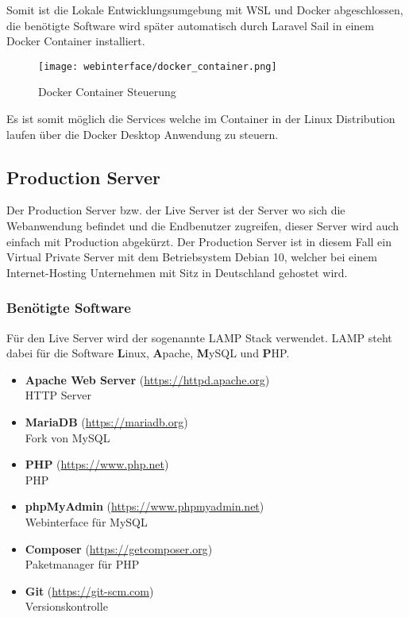 Somit ist die Lokale Entwicklungsumgebung mit WSL und Docker abgeschlossen, die
benötigte Software wird später automatisch durch Laravel Sail in einem Docker
Container installiert.

\begin{figure}[H]
  \centering
  \texttt{[image: webinterface/docker\_container.png]}
  \caption{Docker Container Steuerung}
\end{figure}

Es ist somit möglich die Services welche im Container in der Linux Distribution
laufen über die Docker Desktop Anwendung zu steuern.


\subsection{Production Server}
Der Production Server bzw. der Live Server ist der Server wo sich die
Webanwendung befindet und die Endbenutzer zugreifen, dieser Server wird auch
einfach mit Production abgekürzt. Der Production Server ist in diesem Fall ein
Virtual Private Server mit dem Betriebsystem Debian 10, welcher bei einem
Internet-Hosting Unternehmen mit Sitz in Deutschland gehostet wird.


\subsubsection{Benötigte Software}

Für den Live Server wird der sogenannte \glqq LAMP\grqq{} Stack verwendet. LAMP steht dabei
für die Software \textbf{L}inux, \textbf{A}pache, \textbf{M}ySQL und \textbf{P}HP.

\begin{itemize}
  \item \textbf{Apache Web Server} (\url{https://httpd.apache.org}) \\ HTTP Server
  \item \textbf{MariaDB} (\url{https://mariadb.org}) \\ Fork von MySQL
  \item \textbf{PHP} (\url{https://www.php.net}) \\ \ac*{PHP}
  \item \textbf{phpMyAdmin} (\url{https://www.phpmyadmin.net}) \\ Webinterface
        für MySQL
  \item \textbf{Composer} (\url{https://getcomposer.org}) \\ Paketmanager für PHP
  \item \textbf{Git} (\url{https://git-scm.com}) \\ Versionskontrolle
\end{itemize}


